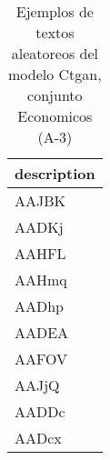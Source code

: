 \begin{table}[H]
\centering
\fontsize{8}{14}\selectfont
\caption{Ejemplos de textos aleatoreos del modelo Ctgan, conjunto Economicos (A-3)}
\label{table-sample10-economicos-a-3-ctgan-text}
\begin{tabular}{|m{50em}|}
\hline
\rowcolor[gray]{0.8}
description \\
\hline AAJBK \\
\hline AADKj \\
\hline AAHFL \\
\hline AAHmq \\
\hline AADhp \\
\hline AADEA \\
\hline AAFOV \\
\hline AAJjQ \\
\hline AADDc \\
\hline AADcx \\
\hline
\end{tabular}
\end{table}
